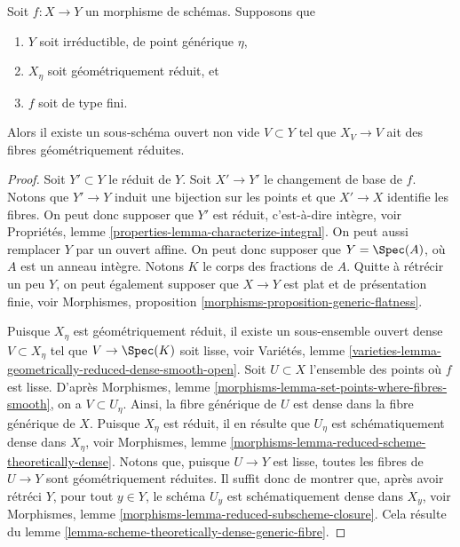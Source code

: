 \begin{lemma}
\label{lemma-geometrically-reduced-generic-fibre}
Soit $f : X \to Y$ un morphisme de schémas.
Supposons que
\begin{enumerate}
\item $Y$ soit irréductible, de point générique $\eta$,
\item $X_\eta$ soit géométriquement réduit, et
\item $f$ soit de type fini.
\end{enumerate}
Alors il existe un sous-schéma ouvert non vide $V \subset Y$
tel que $X_V \to V$ ait des fibres géométriquement réduites.
\end{lemma}

\begin{proof}
Soit $Y' \subset Y$ le réduit de $Y$. Soit $X' \to Y'$
le changement de base de $f$. Notons que $Y' \to Y$
induit une bijection sur les points et que $X' \to X$ identifie les fibres.
On peut donc supposer que $Y'$ est réduit, c'est-à-dire intègre, voir
Propriétés, lemme \ref{properties-lemma-characterize-integral}.
On peut aussi remplacer $Y$ par un ouvert affine. On peut donc supposer que
$Y = \Spec(A)$, où $A$ est un anneau intègre. Notons $K$ le
corps des fractions de $A$. Quitte à rétrécir un peu $Y$, on peut également supposer que
$X \to Y$ est plat et de présentation finie, voir
Morphismes, proposition \ref{morphisms-proposition-generic-flatness}.

\medskip\noindent
Puisque $X_\eta$ est géométriquement réduit, il existe un sous-ensemble ouvert dense
$V \subset X_\eta$ tel que $V \to \Spec(K)$ soit lisse, voir
Variétés, lemme \ref{varieties-lemma-geometrically-reduced-dense-smooth-open}.
Soit $U \subset X$ l'ensemble des points où $f$ est lisse. D'après
Morphismes, lemme \ref{morphisms-lemma-set-points-where-fibres-smooth},
on a $V \subset U_\eta$. Ainsi, la fibre générique de $U$ est dense
dans la fibre générique de $X$. Puisque $X_\eta$ est réduit, il en résulte
que $U_\eta$ est schématiquement dense dans $X_\eta$, voir
Morphismes, lemme \ref{morphisms-lemma-reduced-scheme-theoretically-dense}.
Notons que, puisque $U \to Y$ est lisse, toutes les fibres de $U \to Y$
sont géométriquement réduites. Il suffit donc de montrer que, après avoir
rétréci $Y$, pour tout $y \in Y$, le schéma $U_y$ est schématiquement
dense dans $X_y$, voir
Morphismes, lemme \ref{morphisms-lemma-reduced-subscheme-closure}.
Cela résulte du
lemme \ref{lemma-scheme-theoretically-dense-generic-fibre}.
\end{proof}

